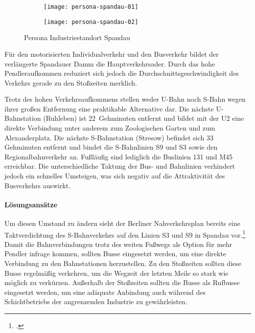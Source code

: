 \begin{figure}
    \centering
    \begin{subfigure}{.5\textwidth}
        \centering
        \texttt{[image: persona-spandau-01]}
    \end{subfigure}%
    \begin{subfigure}{.5\textwidth}
        \centering
        \texttt{[image: persona-spandau-02]}
    \end{subfigure}
    \caption{Persona Industriestandort Spandau}
    \label{persona-spandau}
\end{figure}

Für den motorisierten Individualverkehr und den Busverkehr bildet der verlängerte Spandauer Damm die Hauptverkehrsader. Durch das hohe Pendleraufkommen reduziert sich jedoch die Durchschnittsgeschwindigkeit des Verkehrs gerade zu den Stoßzeiten merklich.

Trotz des hohen Verkehrsaufkommens stellen weder U-Bahn noch S-Bahn wegen ihrer großen Entfernung eine praktikable Alternative dar. Die nächste U-Bahnstation (Ruhleben) ist 22~Gehminuten entfernt und bildet mit der U2 eine direkte Verbindung unter anderem zum Zoologischen Garten und zum Alexanderplatz. Die nächste S-Bahnstation (Stresow) befindet sich 33 Gehminuten entfernt und bindet die S-Bahnlinien S9 und S3 sowie den Regionalbahnverkehr an. Fußläufig sind lediglich die Buslinien 131 und M45 erreichbar. Die unterschiedliche Taktung der Bus- und Bahnlinien verhindert jedoch ein schnelles Umsteigen, was sich negativ auf die Attraktivität des Busverkehrs auswirkt.

\paragraph{Lösungsansätze}

Um diesen Umstand zu ändern sieht der Berliner Nahverkehrsplan bereits eine Taktverdichtung des S-Bahnverkehrs auf den Linien S3 und S9 in Spandau vor.\footcite{NahverkehrsplanBerlin} Damit die Bahnverbindungen trotz des weiten Fußwegs als Option für mehr Pendler infrage kommen, sollten Busse eingesetzt werden, um eine direkte Verbindung zu den Bahnstationen herzustellen. Zu den Stoßzeiten sollten diese Busse regelmäßig verkehren, um die Wegzeit der letzten Meile so stark wie möglich zu verkürzen. Außerhalb der Stoßzeiten sollten die Busse als Rufbusse eingesetzt werden, um eine adäquate Anbindung auch während des Schichtbetriebs der angrenzenden Industrie zu gewährleisten.

